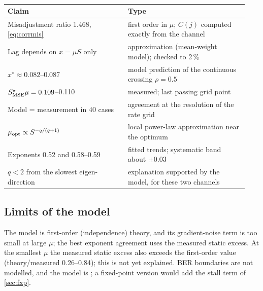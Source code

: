 \begin{newtext}
\begin{table}[t]
\centering\small
\caption{}
\label{tab:claims}
\color{blue}
\setlength{\tabcolsep}{3pt}
\begin{tabular}{@{}p{0.47\linewidth}p{0.47\linewidth}@{}}
\toprule
Claim & Type\\
\midrule
Misadjustment ratio 1.468, \eqref{eq:corrmis} & first order in $\mu$; $C(j)$ computed exactly from the channel\\
Lag depends on $x=\mu S$ only & approximation (mean-weight model); checked to 2\,\%\\
$x^\star\approx0.082$--0.087 & model prediction of the continuous crossing $\rho=0.5$\\
$S^\star_{\rm MSE}\mu=0.109$--0.110 & measured; last passing grid point\\
Model = measurement in 40 cases & agreement at the resolution of the rate grid\\
$\mu_{\rm opt}\propto S^{-q/(q+1)}$ & local power-law approximation near the optimum\\
Exponents 0.52 and 0.58--0.59 & fitted trends; systematic band about $\pm0.03$\\
$q<2$ from the slowest eigen-direction & explanation supported by the model, for these two channels\\
\bottomrule
\end{tabular}
\end{table}

\subsection{Limits of the model}
The model is first-order (independence) theory, and its gradient-noise term is too small at large $\mu$; the best exponent agreement uses the measured static excess. At the smallest $\mu$ the measured static excess also exceeds the first-order value (theory/measured 0.26--0.84); this is not yet explained. BER boundaries are not modelled, and the model is ; a fixed-point version would add the stall term of \cref{sec:fxp}.
\end{newtext}
